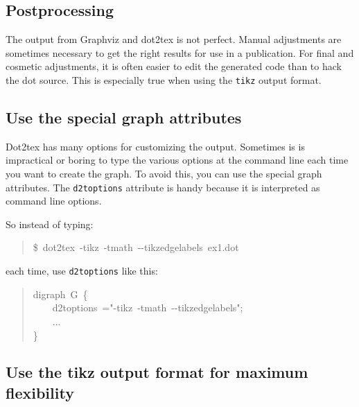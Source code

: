 \documentclass[10pt,a4paper,english]{article}
\begin{document}
\subsection*{Postprocessing}
\label{postprocessing}

The output from Graphviz and dot2tex is not perfect. Manual adjustments are sometimes necessary to get the right results for use in a publication. For final and cosmetic adjustments, it is often easier to edit the generated code than to hack the dot source. This is especially true when using the \texttt{tikz} output format.



\hypertarget{use-the-special-graph-attributes}{}
\subsection*{Use the special graph attributes}
\label{use-the-special-graph-attributes}

Dot2tex has many options for customizing the output. Sometimes is is impractical or boring to type the various options at the command line each time you want to create the graph. To avoid this, you can use the special graph attributes. The \texttt{d2toptions} attribute is handy because it is interpreted as command line options.

So instead of typing:
\begin{quote}{\ttfamily \raggedright \noindent
{\$}~dot2tex~-tikz~-tmath~-{}-tikzedgelabels~ex1.dot
}\end{quote}

each time, use \texttt{d2toptions} like this:
\begin{quote}{\ttfamily \raggedright \noindent
digraph~G~{\{}~\\
~~~~d2toptions~="-tikz~-tmath~-{}-tikzedgelabels";~\\
~~~~...~\\
{\}}
}\end{quote}



\hypertarget{use-the-tikz-output-format-for-maximum-flexibility}{}
\subsection*{Use the tikz output format for maximum flexibility}
\label{use-the-tikz-output-format-for-maximum-flexibility}
\end{document}
